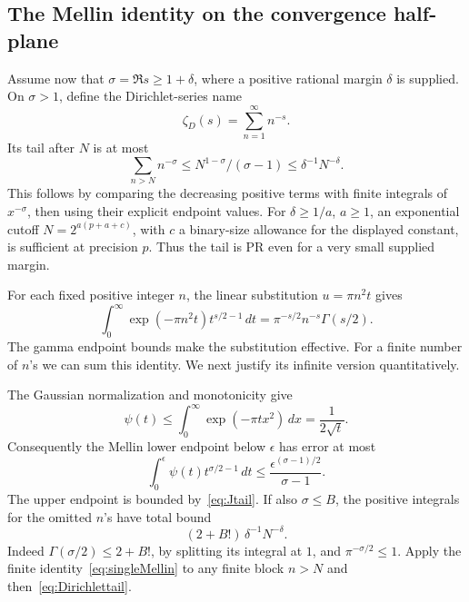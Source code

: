 \documentclass[11pt,letterpaper]{article}
\numberwithin{equation}{section}
\theoremstyle{definition}
\newcommand{\ps}{\psi}
\begin{document}
\subsection{The Mellin identity on the convergence half-plane}

Assume now that \(\sigma=\Re s\ge1+\delta\), where a positive
rational margin \(\delta\) is supplied. On \(\sigma>1\), define
the Dirichlet-series name
\[
                         \zeta_D(s)=\sum_{n=1}^\infty n^{-s}.
\]
Its tail after \(N\) is at most
\begin{equation}
               \sum_{n>N}n^{-\sigma}
                    \le N^{1-\sigma}/(\sigma-1)
                    \le\delta^{-1}N^{-\delta}.            \label{eq:Dirichlettail}
\end{equation}
This follows by comparing the decreasing positive terms with
finite integrals of \(x^{-\sigma}\), then using their explicit
endpoint values. For \(\delta\ge1/a\), \(a\ge1\), an exponential
cutoff \(N=2^{a(p+a+c)}\), with \(c\) a binary-size allowance for
the displayed constant, is sufficient at precision \(p\).
Thus the tail is PR even for a very small supplied margin.

For each fixed positive integer \(n\), the linear substitution
\(u=\pi n^2t\) gives
\begin{equation}
 \int_0^\infty \exp(-\pi n^2t)t^{s/2-1}\,dt
                  =\pi^{-s/2}n^{-s}\Gamma(s/2).
 \label{eq:singleMellin}
\end{equation}
The gamma endpoint bounds make the substitution effective.
For a finite number of \(n\)'s we can sum this identity.
We next justify its infinite version quantitatively.

The Gaussian normalization and monotonicity give
\[
 \ps(t)\le\int_0^\infty \exp(-\pi tx^2)\,dx
                           =\frac1{2\sqrt t}.
\]
Consequently the Mellin lower endpoint below \(\epsilon\) has
error at most
\begin{equation}
 \int_0^\epsilon \ps(t)t^{\sigma/2-1}\,dt
                \le\frac{\epsilon^{(\sigma-1)/2}}{\sigma-1}.
 \label{eq:Mellinlower}
\end{equation}
The upper endpoint is bounded by~\eqref{eq:Jtail}.
If also \(\sigma\le B\), the positive integrals for the omitted
\(n\)'s have total bound
\begin{equation}
 (2+B!)\,\delta^{-1}N^{-\delta}.                           \label{eq:Mellinnsumtail}
\end{equation}
Indeed \(\Gamma(\sigma/2)\le2+B!\), by splitting its integral
at \(1\), and \(\pi^{-\sigma/2}\le1\). Apply the finite
identity~\eqref{eq:singleMellin} to any finite block \(n>N\)
and then~\eqref{eq:Dirichlettail}.
\end{document}
